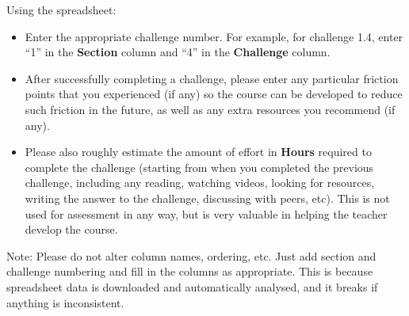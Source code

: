 Using the spreadsheet:

\begin{itemize}
    \item Enter the appropriate challenge number. For example, for challenge 1.4, enter ``1'' in the \textbf{Section} column and ``4'' in the \textbf{Challenge} column.
    \item After successfully completing a challenge, please enter any particular friction points that you experienced (if any) so the course can be developed to reduce such friction in the future, as well as any extra resources you recommend (if any).
    \item Please also roughly estimate the amount of effort in \textbf{Hours} required to complete the challenge (starting from when you completed the previous challenge, including any reading, watching videos, looking for resources, writing the answer to the challenge, discussing with peers, etc). This is not used for assessment in any way, but is very valuable in helping the teacher develop the course.
\end{itemize}

Note: Please do not alter column names, ordering, etc. Just add section and challenge numbering and fill in the columns as appropriate. This is because spreadsheet data is downloaded and automatically analysed, and it breaks if anything is inconsistent.
